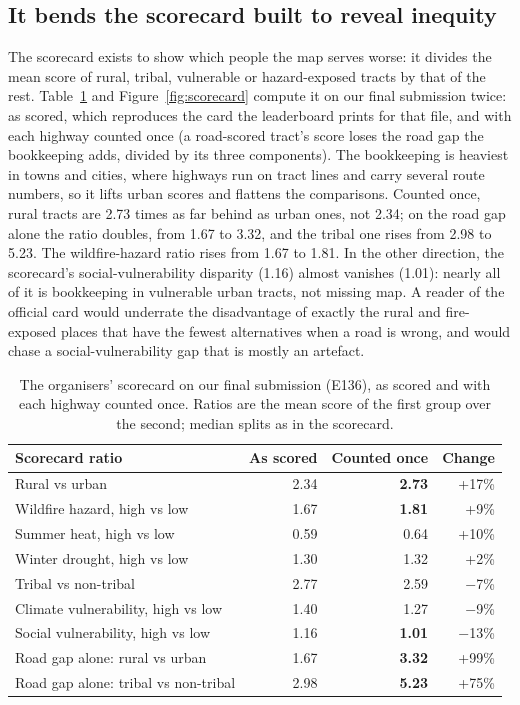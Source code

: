 \documentclass[10pt,twocolumn,a4paper]{article}
\begin{document}
\subsection{It bends the scorecard built to reveal inequity}
\label{sec:scorecard}
The scorecard exists to show which people the map serves worse: it divides the mean score of rural, tribal, vulnerable or
hazard-exposed tracts by that of the rest. Table~\ref{tab:scorecard} and Figure~\ref{fig:scorecard} compute it on our
final submission twice: as scored,
which reproduces the card the leaderboard prints for that file, and with each highway counted once (a road-scored tract's
score loses the road gap the bookkeeping adds, divided by its three components). The bookkeeping is heaviest in towns and
cities, where highways run on tract lines and carry several route numbers, so it lifts urban scores and flattens the
comparisons. Counted once, rural tracts are 2.73 times as far behind as urban ones, not 2.34; on the road gap alone the
ratio doubles, from 1.67 to 3.32, and the tribal one rises from 2.98 to 5.23. The wildfire-hazard ratio rises from 1.67
to 1.81. In the other direction, the scorecard's social-vulnerability disparity (1.16) almost vanishes (1.01): nearly all
of it is bookkeeping in vulnerable urban tracts, not missing map. A reader of the official card would underrate the
disadvantage of exactly the rural and fire-exposed places that have the fewest alternatives when a road is wrong, and
would chase a social-vulnerability gap that is mostly an artefact.

\begin{table}[t]
\centering\small
\caption{The organisers' scorecard on our final submission (E136), as scored and with each highway counted once. Ratios
are the mean score of the first group over the second; median splits as in the scorecard.}
\label{tab:scorecard}
\footnotesize\setlength{\tabcolsep}{2.5pt}
\begin{tabular*}{\columnwidth}{@{\extracolsep{\fill}}lrrr@{}}
\toprule
Scorecard ratio & As scored & Counted once & Change\\
\midrule
Rural vs urban & 2.34 & \textbf{2.73} & +17\%\\
Wildfire hazard, high vs low & 1.67 & \textbf{1.81} & +9\%\\
Summer heat, high vs low & 0.59 & 0.64 & +10\%\\
Winter drought, high vs low & 1.30 & 1.32 & +2\%\\
Tribal vs non-tribal & 2.77 & 2.59 & $-$7\%\\
Climate vulnerability, high vs low & 1.40 & 1.27 & $-$9\%\\
Social vulnerability, high vs low & 1.16 & \textbf{1.01} & $-$13\%\\
\midrule
Road gap alone: rural vs urban & 1.67 & \textbf{3.32} & +99\%\\
Road gap alone: tribal vs non-tribal & 2.98 & \textbf{5.23} & +75\%\\
\bottomrule
\end{tabular*}
\end{table}
\end{document}
